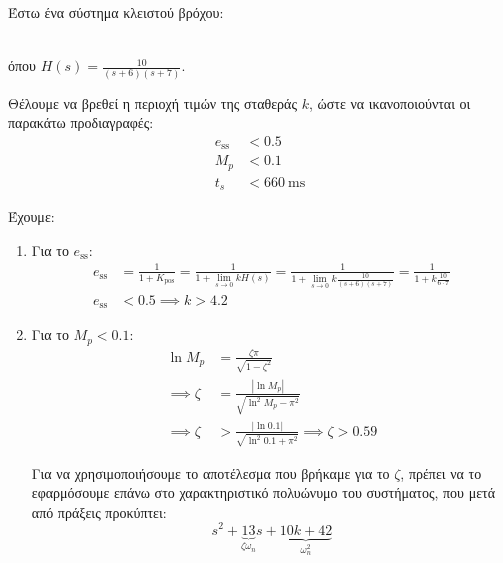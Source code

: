 \documentclass[11pt,a4paper,notitlepage,fleqn]{article}
\begin{document}
\begin{exercise}
Έστω ένα σύστημα κλειστού βρόχου:
 \\
όπου \( \displaystyle H(s) = \frac{10}{(s+6)(s+7)} \).

Θέλουμε να βρεθεί η περιοχή τιμών της σταθεράς \( k \), ώστε να ικανοποιούνται οι
παρακάτω προδιαγραφές:
\begin{align*}
	e_{\mathrm{ss}} &< 0.5 \\
	M_p &< 0.1 \\
	t_s &< 660\ \mathrm{ms}
\end{align*}

\tcblower

Έχουμε:
\begin{enumerate}
	\item Για το \( e_{\mathrm{ss}} \):
	\begin{align*}
		e_{\mathrm{ss}} &= \frac{1}{1+K_{\mathrm{pos}}}
		= \frac{1}{1+\lim_{s\to 0}kH(s)}
		= \frac{1}{1+\lim_{s\to 0}k\frac{10}{(s+6)(s+7)}}
		= \frac{1}{1+k\frac{10}{6\cdot 7}} \\
		e_{\mathrm{ss}} &< 0.5 \implies \boxed{k > 4.2}
	\end{align*}
	\item Για το \( M_p < 0.1 \):
	\begin{align*}
		\ln M_p &= \frac{ζπ}{\sqrt{1-ζ^2}}\\
		\implies ζ &= \frac{\left\lvert \ln M_p \right\rvert}{
			\sqrt{\ln^2 M_p - π^2}
			}\\
		\implies ζ &> \frac{|\ln 0.1 |}{\sqrt{\ln^2 0.1 + π^2}}
		\implies \boxed{ζ > 0.59}
	\end{align*}
	
	Για να χρησιμοποιήσουμε το αποτέλεσμα που βρήκαμε για το \( ζ \), πρέπει να το
	εφαρμόσουμε επάνω στο χαρακτηριστικό πολυώνυμο του συστήματος, που μετά από πράξεις
	προκύπτει:
	\[
	s^2+
	\underbrace{13}_{ζ\omega_n}s
	+\underbrace{10k+42}_{\omega_n^2}
	\]
	

\end{enumerate}
\end{exercise}
\end{document}
